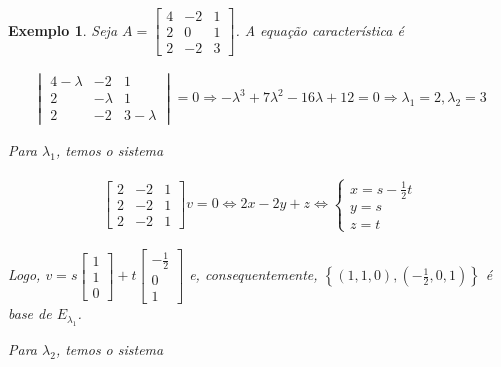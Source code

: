 \documentclass{article}
\newtheorem*{example}{Exemplo}
\begin{document}
\begin{example}
	Seja $A = \begin{bmatrix}
	4 & -2 & 1 \\
	2 & 0 & 1 \\
	2 & -2 & 3
	\end{bmatrix}$. A equação característica é
	
	\begin{align*}
	\begin{vmatrix}
	4-\lambda & -2 & 1 \\
	2 & -\lambda & 1 \\
	2 & -2 & 3-\lambda
	\end{vmatrix} = 0 \Rightarrow -\lambda^3 + 7\lambda^2 - 16\lambda + 12 = 0 \Rightarrow \lambda_1 = 2, \lambda_2 = 3
	\end{align*}
	
	\par\vspace{0.3cm} Para $\lambda_1$, temos o sistema
	
	\begin{align*}
	\begin{bmatrix}
	2 & -2 & 1\\
	2 & -2 & 1\\
	2 & -2 & 1
	\end{bmatrix}v = 0 \Leftrightarrow 2x - 2y + z \Leftrightarrow \begin{cases}
	x = s - \displaystyle{\frac{1}{2}t} \\
	y = s\\
	z = t
	\end{cases}
	\end{align*}
	
	\par\vspace{0.3cm} Logo, $v = s\begin{bmatrix}
	1\\
	1\\
	0
	\end{bmatrix} + t\begin{bmatrix}
	-\displaystyle{\frac{1}{2}}\\
	0\\
	1
	\end{bmatrix}$ e, consequentemente, $\left\{ \left( 1, 1, 0  \right), \left( -\displaystyle{\frac{1}{2}}, 0, 1 \right)     \right\}$ é base de $E_{\lambda_1}$.
	
	\par\vspace{0.3cm} Para $\lambda_2$, temos o sistema
	

\end{example}
\end{document}
